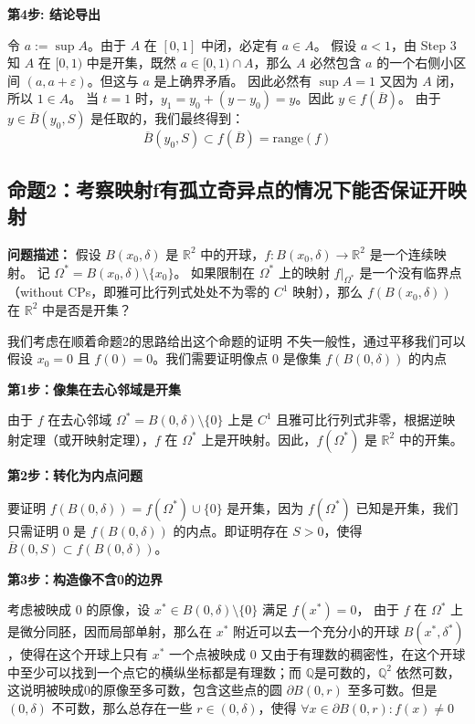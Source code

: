 \documentclass[12pt,a4paper]{ctexart}
\begin{document}
\textbf{第4步: 结论导出}

令 $a := \sup A$。由于 $A$ 在 $[0, 1]$ 中闭，必定有 $a \in A$。
假设 $a < 1$，由 Step 3 知 $A$ 在 $[0, 1)$ 中是开集，既然 $a \in [0, 1) \cap A$，那么 $A$ 必然包含 $a$ 的一个右侧小区间 $(a, a + \varepsilon)$。但这与 $a$ 是上确界矛盾。
因此必然有 $\sup A = 1$
又因为 $A$ 闭，所以 $1 \in A$。
当 $t = 1$ 时，$y_1 = y_0 + (y - y_0) = y$。因此 $y \in f(\overline{B})$。
由于 $y \in \overline{B}(y_0, S)$ 是任取的，我们最终得到：
\[
\overline{B}(y_0, S) \subset f(\overline{B}) = \text{range}(f)
\]


\subsection*{命题2：考察映射f有孤立奇异点的情况下能否保证开映射}

\textbf{问题描述：}
假设 $B(x_0, \delta)$ 是 $\mathbb{R}^2$ 中的开球，$f: B(x_0, \delta) \to \mathbb{R}^2$ 是一个连续映射。
记 $\Omega^* = B(x_0, \delta) \setminus \{x_0\}$。
如果限制在 $\Omega^*$ 上的映射 $f|_{\Omega^*}$ 是一个没有临界点（without CPs，即雅可比行列式处处不为零的 $C^1$ 映射），那么 $f(B(x_0, \delta))$ 在 $\mathbb{R}^2$ 中是否是开集？

我们考虑在顺着命题2的思路给出这个命题的证明
不失一般性，通过平移我们可以假设 $x_0 = 0$ 且 $f(0) = 0$。我们需要证明像点 $0$ 是像集 $f(B(0, \delta))$ 的内点

\textbf{第1步：像集在去心邻域是开集}

由于 $f$ 在去心邻域 $\Omega^* = B(0, \delta) \setminus \{0\}$ 上是 $C^1$ 且雅可比行列式非零，根据逆映射定理（或开映射定理），$f$ 在 $\Omega^*$ 上是开映射。因此，$f(\Omega^*)$ 是 $\mathbb{R}^2$ 中的开集。

\textbf{第2步：转化为内点问题}

要证明 $f(B(0, \delta)) = f(\Omega^*) \cup \{0\}$ 是开集，因为 $f(\Omega^*)$ 已知是开集，我们只需证明 $0$ 是 $f(B(0, \delta))$ 的内点。即证明存在 $S > 0$，使得 $\overline{B}(0, S) \subset f(B(0, \delta))$。

\textbf{第3步：构造像不含0的边界}

考虑被映成 0 的原像，设 $x^*\in B(0,\delta)\setminus\{0\}$ 满足 $f(x^*)=0$，
由于 $f$ 在 $\Omega^*$ 上是微分同胚，因而局部单射，那么在 $x^*$ 附近可以去一个充分小的开球 $B(x^*,\delta^*)$，使得在这个开球上只有 $x^*$ 一个点被映成 0
又由于有理数的稠密性，在这个开球中至少可以找到一个点它的横纵坐标都是有理数；而 $\mathbb{Q}$是可数的，$\mathbb{Q}^2$ 依然可数，这说明被映成0的原像至多可数，包含这些点的圆 $\partial B(0,r)$ 至多可数。但是 $(0,\delta)$ 不可数，那么总存在一些 $r\in(0,\delta)$，使得 $\forall x \in \partial B(0,r):f(x)\not =0$
\end{document}
